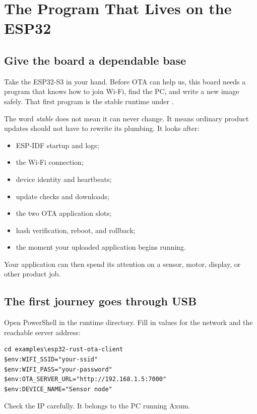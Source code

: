\chapter{The Program That Lives on the ESP32}

\section{Give the board a dependable base}

Take the ESP32-S3 in your hand. Before OTA can help us, this board needs a program that knows how to join Wi-Fi, find the PC, and write a new image safely. That first program is the stable runtime under .

The word \emph{stable} does not mean it can never change. It means ordinary product updates should not have to rewrite its plumbing. It looks after:

\begin{itemize}
  \item ESP-IDF startup and logs;
  \item the Wi-Fi connection;
  \item device identity and heartbeats;
  \item update checks and downloads;
  \item the two OTA application slots;
  \item hash verification, reboot, and rollback;
  \item the moment your uploaded application begins running.
\end{itemize}

Your application can then spend its attention on a sensor, motor, display, or other product job.

\section{The first journey goes through USB}

Open PowerShell in the runtime directory. Fill in values for the network and the reachable server address:

\begin{lstlisting}
cd examples\esp32-rust-ota-client
$env:WIFI_SSID="your-ssid"
$env:WIFI_PASS="your-password"
$env:OTA_SERVER_URL="http://192.168.1.5:7000"
$env:DEVICE_NAME="Sensor node"
\end{lstlisting}

Check the IP carefully. It belongs to the PC running Axum.


